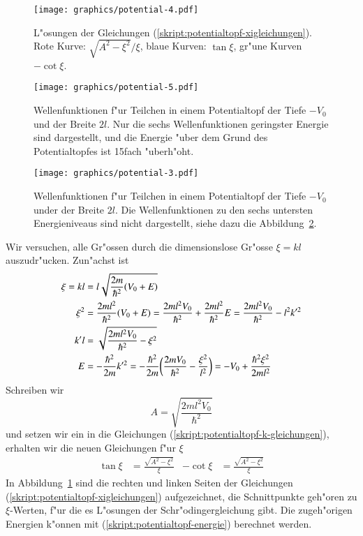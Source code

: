 \begin{figure}
\centering
\texttt{[image: graphics/potential-4.pdf]}
\caption{L"osungen der Gleichungen (\ref{skript:potentialtopf-xigleichungen}).
Rote Kurve: $\sqrt{A^2-\xi^2}/\xi$, blaue Kurven: $\tan\xi$, gr"une
Kurven $-\cot\xi$.
\label{skript:loesungen-xigleichungen}}
\end{figure}%
\begin{figure}
\centering
\texttt{[image: graphics/potential-5.pdf]}
\caption{Wellenfunktionen f"ur Teilchen in einem Potentialtopf der
Tiefe $-V_0$ und der Breite $2l$. Nur die sechs Wellenfunktionen 
geringster Energie sind dargestellt, und die Energie "uber dem
Grund des Potentialtopfes ist 15fach "uberh"oht.
\label{skript:potentialtopf-loesungen-klein}}
\end{figure}
\begin{figure}
\centering
\texttt{[image: graphics/potential-3.pdf]}
\caption{Wellenfunktionen f"ur Teilchen in einem Potentialtopf der
Tiefe $-V_0$ under der Breite $2l$. Die Wellenfunktionen zu den sechs
untersten Energieniveaus sind nicht dargestellt, siehe dazu die
Abbildung~\ref{skript:potentialtopf-loesungen-klein}.
\label{skript:potentialtopf-loesungen}}
\end{figure}
Wir versuchen, alle Gr"ossen durch die dimensionslose Gr"osse $\xi=kl$
auszudr"ucken.
Zun"achst ist
\begin{align}
\xi=kl&=l\sqrt{\frac{2m}{\hbar^2}(V_0+E)}
\notag
\\
\xi^2
&=
\frac{2ml^2}{\hbar^2}(V_0+E)
=
\frac{2ml^2V_0}{\hbar^2} +\frac{2ml^2}{\hbar^2}E
=
\frac{2ml^2V_0}{\hbar^2}-l^2k'^2
\notag
\\
k'l
&=
\sqrt{\frac{2ml^2V_0}{\hbar^2} - \xi^2}
\notag
\\
E
&=
-\frac{\hbar^2}{2m}k'^2
=
-\frac{\hbar^2}{2m}
\biggl(
\frac{2mV_0}{\hbar^2} - \frac{\xi^2}{l^2}
\biggr)
=
-V_0+\frac{\hbar^2\xi^2}{2ml^2}
\label{skript:potentialtopf-energie}
\end{align}
Schreiben wir
\[
A=\sqrt{\frac{2ml^2V_0}{\hbar^2}}
\]
und setzen wir ein in die Gleichungen (\ref{skript:potentialtopf-k-gleichungen}),
erhalten wir die neuen Gleichungen f"ur $\xi$
\begin{align}
\tan \xi&=\frac{\sqrt{A^2-\xi^2}}{\xi}
&
-\cot \xi&=\frac{\sqrt{A^2-\xi^2}}{\xi}
\label{skript:potentialtopf-xigleichungen}
\end{align}
In Abbildung~\ref{skript:loesungen-xigleichungen} sind die rechten und linken
Seiten der Gleichungen (\ref{skript:potentialtopf-xigleichungen}) aufgezeichnet,
die Schnittpunkte geh"oren zu $\xi$-Werten, f"ur die es L"osungen
der Schr"odingergleichung gibt.
Die zugeh"origen Energien k"onnen mit (\ref{skript:potentialtopf-energie})
berechnet werden.

